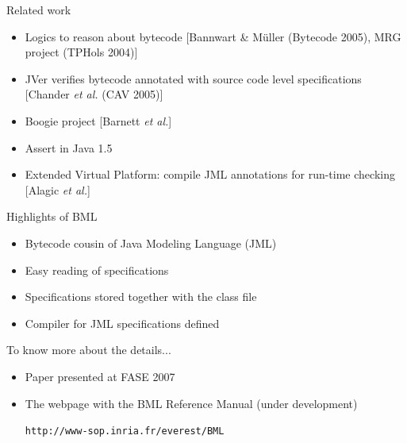 \documentclass[final,nocolorBG,a4,mobius,nototal,pdf,slideColor]{prosper}
\begin{document}
\begin{slide}{Related work}
\begin{itemize}
\item Logics to reason about bytecode [Bannwart \& M\"uller (Bytecode 2005), MRG project (TPHols 2004)]
\item JVer verifies bytecode annotated with source code level specifications
[Chander \emph{et al.} (CAV 2005)]
\item Boogie project [Barnett \emph{et al.}]
\item Assert in Java 1.5
\item Extended Virtual Platform: compile JML annotations for run-time checking
[Alagic \emph{et al.}]
\end{itemize}
\end{slide}

\begin{slide}{Highlights of BML}
\begin{itemize}
\item Bytecode cousin of Java Modeling Language (JML)
\item Easy reading of specifications
\item Specifications stored together with the class file
\item Compiler for JML specifications defined
\end{itemize}
\end{slide}

\begin{slide}{To know more about the details...}
\begin{itemize}
\item Paper presented at FASE 2007
\item The webpage with the BML Reference Manual (under development)
\begin{center}
\texttt{http://www-sop.inria.fr/everest/BML}
\end{center}
\end{itemize}
\end{slide}
\end{document}
